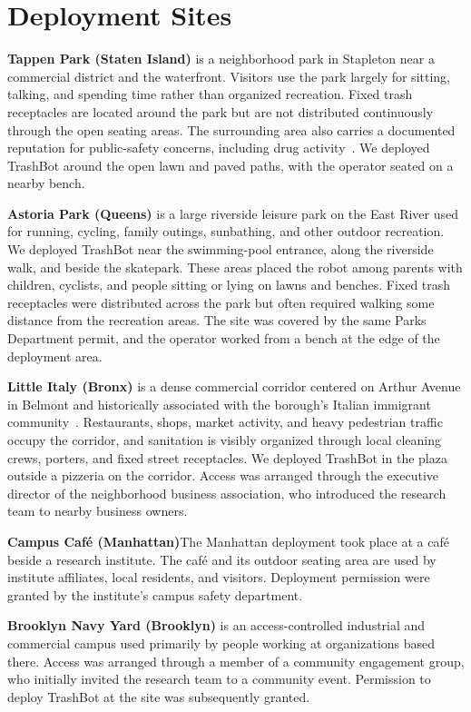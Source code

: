 \appendix

\section{Deployment Sites}
\label{app:sites}

\textbf{Tappen Park (Staten Island)} is a neighborhood park in Stapleton near a commercial district and the waterfront. Visitors use the park largely for sitting, talking, and spending time rather than organized recreation. Fixed trash receptacles are located around the park but are not distributed continuously through the open seating areas. The surrounding area also carries a documented reputation for public-safety concerns, including drug activity~\cite{sifentanyltaskforce2024}. We deployed TrashBot around the open lawn and paved paths, with the operator seated on a nearby bench.

\textbf{Astoria Park (Queens)} is a large riverside leisure park on the East River used for running, cycling, family outings, sunbathing, and other outdoor recreation. We deployed TrashBot near the swimming-pool entrance, along the riverside walk, and beside the skatepark. These areas placed the robot among parents with children, cyclists, and people sitting or lying on lawns and benches. Fixed trash receptacles were distributed across the park but often required walking some distance from the recreation areas. The site was covered by the same Parks Department permit, and the operator worked from a bench at the edge of the deployment area.

\textbf{Little Italy (Bronx)} is a dense commercial corridor centered on Arthur Avenue in Belmont and historically associated with the borough's Italian immigrant community~\cite{apa2016arthuravenue, helmreich2023bronx}. Restaurants, shops, market activity, and heavy pedestrian traffic occupy the corridor, and sanitation is visibly organized through local cleaning crews, porters, and fixed street receptacles. We deployed TrashBot in the plaza outside a pizzeria on the corridor. Access was arranged through the executive director of the neighborhood business association, who introduced the research team to nearby business owners.

\textbf{Campus Café (Manhattan)}The Manhattan deployment took place at a café beside a research institute. The café and its outdoor seating area are used by institute affiliates, local residents, and visitors. Deployment permission were granted by the institute's campus safety department.

\textbf{Brooklyn Navy Yard (Brooklyn)} is an access-controlled industrial and commercial campus used primarily by people working at organizations based there. Access was arranged
through a member of a community engagement group, who initially invited the research team to a community event. Permission to deploy TrashBot at the site was subsequently granted.


